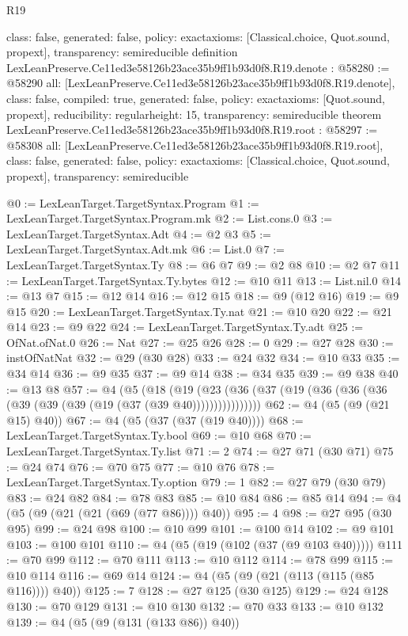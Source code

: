 \begin{lexlean}{R19}
\begin{coremodule}
{  class: false,
  generated: false,
  policy: exact{axioms: [Classical.choice, Quot.sound, propext]},
  transparency: semireducible
}
definition LexLeanPreserve.Ce11ed3e58126b23ace35b9ff1b93d0f8.R19.denote : @58280 := @58290 {
  all: [LexLeanPreserve.Ce11ed3e58126b23ace35b9ff1b93d0f8.R19.denote],
  class: false,
  compiled: true,
  generated: false,
  policy: exact{axioms: [Quot.sound, propext]},
  reducibility: regular{height: 15},
  transparency: semireducible
}
theorem LexLeanPreserve.Ce11ed3e58126b23ace35b9ff1b93d0f8.R19.root : @58297 := @58308 {
  all: [LexLeanPreserve.Ce11ed3e58126b23ace35b9ff1b93d0f8.R19.root],
  class: false,
  generated: false,
  policy: exact{axioms: [Classical.choice, Quot.sound, propext]},
  transparency: semireducible
}

@0 := LexLeanTarget.TargetSyntax.Program
@1 := LexLeanTarget.TargetSyntax.Program.mk
@2 := List.cons.{0}
@3 := LexLeanTarget.TargetSyntax.Adt
@4 := @2 @3
@5 := LexLeanTarget.TargetSyntax.Adt.mk
@6 := List.{0}
@7 := LexLeanTarget.TargetSyntax.Ty
@8 := @6 @7
@9 := @2 @8
@10 := @2 @7
@11 := LexLeanTarget.TargetSyntax.Ty.bytes
@12 := @10 @11
@13 := List.nil.{0}
@14 := @13 @7
@15 := @12 @14
@16 := @12 @15
@18 := @9 (@12 @16)
@19 := @9 @15
@20 := LexLeanTarget.TargetSyntax.Ty.nat
@21 := @10 @20
@22 := @21 @14
@23 := @9 @22
@24 := LexLeanTarget.TargetSyntax.Ty.adt
@25 := OfNat.ofNat.{0}
@26 := Nat
@27 := @25 @26
@28 := 0
@29 := @27 @28
@30 := instOfNatNat
@32 := @29 (@30 @28)
@33 := @24 @32
@34 := @10 @33
@35 := @34 @14
@36 := @9 @35
@37 := @9 @14
@38 := @34 @35
@39 := @9 @38
@40 := @13 @8
@57 := @4
    (@5
      (@18 (@19 (@23 (@36 (@37 (@19 (@36 (@36 (@36 (@39 (@39 (@39 (@19 (@37 (@39 @40))))))))))))))))
@62 := @4 (@5 (@9 (@21 @15) @40))
@67 := @4 (@5 (@37 (@37 (@19 @40))))
@68 := LexLeanTarget.TargetSyntax.Ty.bool
@69 := @10 @68
@70 := LexLeanTarget.TargetSyntax.Ty.list
@71 := 2
@74 := @27 @71 (@30 @71)
@75 := @24 @74
@76 := @70 @75
@77 := @10 @76
@78 := LexLeanTarget.TargetSyntax.Ty.option
@79 := 1
@82 := @27 @79 (@30 @79)
@83 := @24 @82
@84 := @78 @83
@85 := @10 @84
@86 := @85 @14
@94 := @4 (@5 (@9 (@21 (@21 (@69 (@77 @86)))) @40))
@95 := 4
@98 := @27 @95 (@30 @95)
@99 := @24 @98
@100 := @10 @99
@101 := @100 @14
@102 := @9 @101
@103 := @100 @101
@110 := @4 (@5 (@19 (@102 (@37 (@9 @103 @40)))))
@111 := @70 @99
@112 := @70 @111
@113 := @10 @112
@114 := @78 @99
@115 := @10 @114
@116 := @69 @14
@124 := @4 (@5 (@9 (@21 (@113 (@115 (@85 @116)))) @40))
@125 := 7
@128 := @27 @125 (@30 @125)
@129 := @24 @128
@130 := @70 @129
@131 := @10 @130
@132 := @70 @33
@133 := @10 @132
@139 := @4 (@5 (@9 (@131 (@133 @86)) @40))

\end{coremodule}
\end{lexlean}
